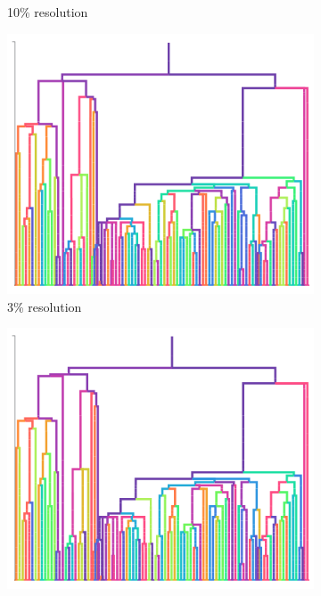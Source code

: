 \begin{figure}
\begin{subfigure}[b]{\linewidth}
    \caption{10\% resolution}
    \label{fig:perfect-tree-phylometrics-sensitivity-analysis:epoch2}
  \end{subfigure}
  \begin{subfigure}[b]{\linewidth}
    \centering
    \includegraphics[width=\textwidth, height=0.16\textheight]{img/plain_resolution_30}
    \caption{3\% resolution}
    \label{fig:perfect-tree-phylometrics-sensitivity-analysis:exponential}
  \end{subfigure}
  \begin{subfigure}[b]{\linewidth}
    \centering
    \includegraphics[width=\textwidth, height=0.16\textheight]{img/plain_resolution_100}

\end{subfigure}
\end{figure}
